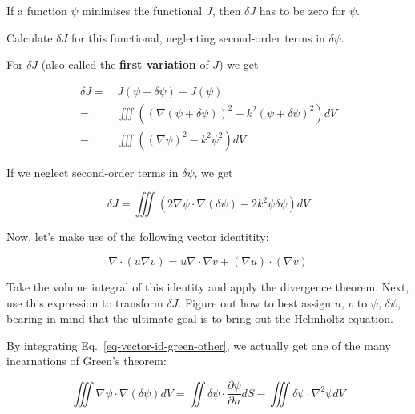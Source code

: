 \noindent{}If a function $\psi$ minimises the functional $J$, then $\delta J$ has to be zero for $\psi$.

\begin{cue}
Calculate $\delta J$ for this functional, neglecting second-order terms in $\delta \psi$.
\end{cue}

\noindent{}For $\delta J$ (also called the \textbf{first variation} of $J$) we get

\begin{align}
\delta J =& \, J(\psi + \delta \psi) - J(\psi) \nonumber \\
  =& \, \iiint \left( (\nabla (\psi + \delta \psi))^2 - k^2 (\psi + \delta \psi)^2 \right) dV \nonumber   \\
  -& \, \iiint \left((\nabla \psi)^2 - k^2 \psi^2 \right) dV
\end{align} 

If we neglect second-order terms in $\delta \psi$, we get

\begin{equation}
\delta J = \iiint \left( 2 \nabla \psi \cdot \nabla (\delta \psi) - 2 k^2 \psi \delta \psi \right) dV
\end{equation}

Now, let's make use of the following vector identitity:

$$\nabla \cdot (u \nabla v) = u \nabla \cdot \nabla v + (\nabla u) \cdot (\nabla v)$$ \label{eq-vector-id-green-other}

\begin{cue}
Take the volume integral of this identity and apply the divergence theorem. Next, use this expression to transform $\delta J$. Figure out how to best assign $u$, $v$ to $\psi$, $\delta \psi$, bearing in mind that the ultimate goal is to bring out the Helmholtz equation.
\end{cue}

By integrating Eq.~\ref{eq-vector-id-green-other}, we actually get one of the many incarnations of Green's theorem:

\begin{equation}
\iiint \nabla \psi \cdot \nabla (\delta \psi) dV = \iint \delta \psi \cdot \frac{\partial \psi}{\partial n} dS - \iiint \delta \psi \cdot \nabla^2 \psi dV
\end{equation} 

